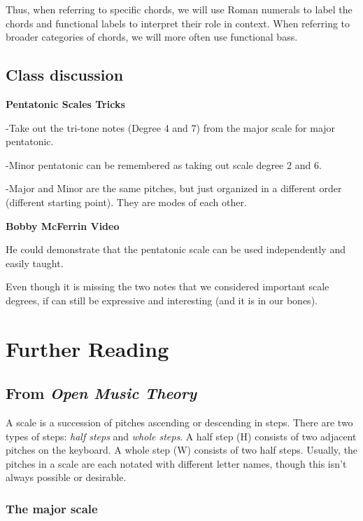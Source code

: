 \documentclass{book}
\begin{document}
Thus, when referring to specific chords, we will use Roman numerals to label
the chords and functional labels to interpret their role in context. When
referring to broader categories of chords, we will more often use functional
bass.

\hypertarget{class-discussion-9}{%
\section{Class discussion}\label{class-discussion-9}}

\textbf{Pentatonic Scales Tricks}

-Take out the tri-tone notes (Degree 4 and 7) from the major scale for major
pentatonic.

-Minor pentatonic can be remembered as taking out scale degree 2 and 6.

-Major and Minor are the same pitches, but just organized in a different order
(different starting point). They are modes of each other.

\textbf{Bobby McFerrin Video}

He could demonstrate that the pentatonic scale can be used independently and
easily taught.

Even though it is missing the two notes that we considered important scale
degrees, if can still be expressive and interesting (and it is in our bones).

\hypertarget{further-reading-5}{%
\chapter{Further Reading}\label{further-reading-5}}

\hypertarget{from-open-music-theory-6}{%
\section{\texorpdfstring{From \emph{Open Music
Theory}}{From Open Music Theory}}\label{from-open-music-theory-6}}

A scale is a succession of pitches ascending or descending in steps. There are
two types of steps: \emph{half steps} and \emph{whole steps}. A half step (H)
consists of two adjacent pitches on the keyboard. A whole step (W) consists of
two half steps. Usually, the pitches in a scale are each notated with
different letter names, though this isn't always possible or desirable.

\hypertarget{the-major-scale}{%
\subsection{The major scale}\label{the-major-scale}}
\end{document}
